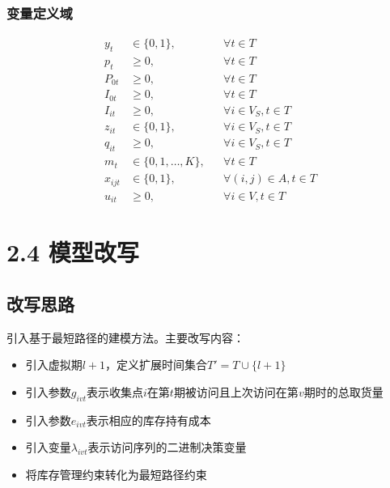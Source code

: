 \documentclass{article}
\begin{document}
\subsubsection{变量定义域}
\vspace{-1.5ex}
\begin{align}
y_t &\in \{0,1\}, && \forall t \in T  \\
p_t &\geq 0, && \forall t \in T \\
P_{0t} &\geq 0, && \forall t \in T \\
I_{0t} &\geq 0, && \forall t \in T \\
I_{it} &\geq 0, && \forall i \in V_S, t \in T  \\
z_{it} &\in \{0,1\}, && \forall i \in V_S, t \in T  \\
q_{it} &\geq 0, && \forall i \in V_S, t \in T \\
m_t &\in \{0,1,\ldots,K\}, && \forall t \in T \\
x_{ijt} &\in \{0,1\}, && \forall (i,j) \in A, t \in T \\
u_{it} &\geq 0, && \forall i \in V, t \in T
\end{align}







\newpage
\section{2.4 模型改写}

\subsection{改写思路}
引入基于最短路径的建模方法。主要改写内容：
\begin{itemize}
\item 引入虚拟期$l+1$，定义扩展时间集合$T' = T \cup \{l+1\}$
\item 引入参数$g_{ivt}$表示收集点$i$在第$t$期被访问且上次访问在第$v$期时的总取货量
\item 引入参数$e_{ivt}$表示相应的库存持有成本
\item 引入变量$\lambda_{ivt}$表示访问序列的二进制决策变量
\item 将库存管理约束转化为最短路径约束
\end{itemize}
\end{document}
